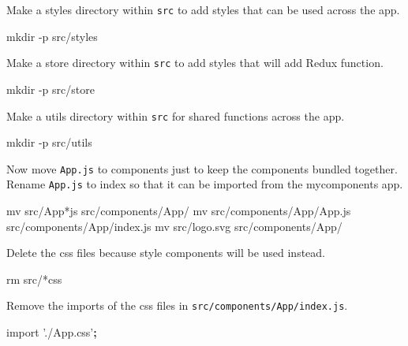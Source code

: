\documentclass[]{book}
\newenvironment{Shaded}{\begin{snugshade}}{\end{snugshade}}
\newcommand{\ExtensionTok}[1]{#1}
\newcommand{\FunctionTok}[1]{\textcolor[rgb]{0.00,0.00,0.00}{#1}}
\newcommand{\KeywordTok}[1]{\textcolor[rgb]{0.13,0.29,0.53}{\textbf{#1}}}
\newcommand{\NormalTok}[1]{#1}
\newcommand{\StringTok}[1]{\textcolor[rgb]{0.31,0.60,0.02}{#1}}
\begin{document}
Make a styles directory within \texttt{src} to add styles that can be used across the app.

\begin{Shaded}
\begin{Highlighting}[]
\FunctionTok{mkdir}\NormalTok{ -p src/styles}
\end{Highlighting}
\end{Shaded}

Make a store directory within \texttt{src} to add styles that will add Redux function.

\begin{Shaded}
\begin{Highlighting}[]
\FunctionTok{mkdir}\NormalTok{ -p src/store}
\end{Highlighting}
\end{Shaded}

Make a utils directory within \texttt{src} for shared functions across the app.

\begin{Shaded}
\begin{Highlighting}[]
\FunctionTok{mkdir}\NormalTok{ -p src/utils}
\end{Highlighting}
\end{Shaded}

Now move \texttt{App.js} to components just to keep the components bundled together.
Rename \texttt{App.js} to index so that it can be imported from the mycomponents app.

\begin{Shaded}
\begin{Highlighting}[]
\FunctionTok{mv}\NormalTok{ src/App*js src/components/App/}
\FunctionTok{mv}\NormalTok{ src/components/App/App.js src/components/App/index.js}
\FunctionTok{mv}\NormalTok{ src/logo.svg src/components/App/}
\end{Highlighting}
\end{Shaded}

Delete the css files because style components will be used instead.

\begin{Shaded}
\begin{Highlighting}[]
\FunctionTok{rm}\NormalTok{ src/*css}
\end{Highlighting}
\end{Shaded}

Remove the imports of the css files in \texttt{src/components/App/index.js}.

\begin{Shaded}
\begin{Highlighting}[]
\ExtensionTok{import} \StringTok{'./App.css'}\KeywordTok{;}
\end{Highlighting}
\end{Shaded}
\end{document}
